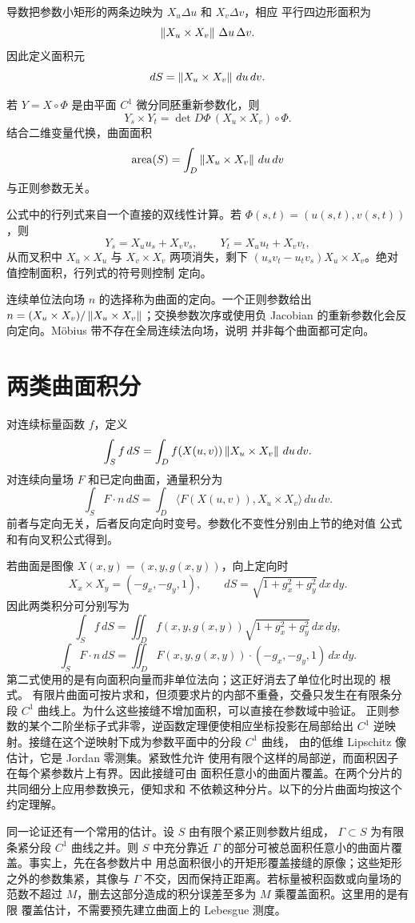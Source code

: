 导数把参数小矩形的两条边映为 $X_u\Delta u$ 和 $X_v\Delta v$，相应
平行四边形面积为
\[
 \left\lVert X_u\times X_v\right\rVert\,\Delta u\,\Delta v.
\]
因此定义面积元
\[
 dS=\left\lVert X_u\times X_v\right\rVert\,du\,dv.
\]

若 $Y=X\circ\Phi$ 是由平面 $C^1$ 微分同胚重新参数化，则
\[
 Y_s\times Y_t
 =\det D\Phi\,(X_u\times X_v)\circ\Phi.
\]
结合二维变量代换，曲面面积
\[
 \operatorname{area}(S)=\int_D\left\lVert X_u\times X_v\right\rVert\,du\,dv
\]
与正则参数无关。

公式中的行列式来自一个直接的双线性计算。若
$\Phi(s,t)=(u(s,t),v(s,t))$，则
\[
 Y_s=X_u u_s+X_v v_s,\qquad
 Y_t=X_u u_t+X_v v_t,
\]
从而叉积中 $X_u\times X_u$ 与 $X_v\times X_v$ 两项消失，剩下
$(u_sv_t-u_tv_s)X_u\times X_v$。绝对值控制面积，行列式的符号则控制
定向。

连续单位法向场 $n$ 的选择称为曲面的定向。一个正则参数给出
$n=(X_u\times X_v)/\left\lVert X_u\times X_v\right\rVert$；交换参数次序或使用负
Jacobian 的重新参数化会反向定向。Möbius 带不存在全局连续法向场，说明
并非每个曲面都可定向。

\section{两类曲面积分}

对连续标量函数 $f$，定义
\[
 \int_Sf\,dS
 =\int_Df(X(u,v))\left\lVert X_u\times X_v\right\rVert\,du\,dv.
\]
对连续向量场 $F$ 和已定向曲面，通量积分为
\[
 \int_SF\cdot n\,dS
 =\int_D\langle F(X(u,v)),X_u\times X_v\rangle\,du\,dv.
\]
前者与定向无关，后者反向定向时变号。参数化不变性分别由上节的绝对值
公式和有向叉积公式得到。

若曲面是图像 $X(x,y)=(x,y,g(x,y))$，向上定向时
\[
 X_x\times X_y=(-g_x,-g_y,1),\qquad
 dS=\sqrt{1+g_x^2+g_y^2}\,dx\,dy.
\]
因此两类积分可分别写为
\[
 \int_S f\,dS
 =\iint_D f(x,y,g(x,y))\sqrt{1+g_x^2+g_y^2}\,dx\,dy,
\]
\[
 \int_SF\cdot n\,dS
 =\iint_DF(x,y,g(x,y))\cdot(-g_x,-g_y,1)\,dx\,dy.
\]
第二式使用的是有向面积向量而非单位法向；这正好消去了单位化时出现的
根式。
有限片曲面可按片求和，但须要求片的内部不重叠，交叠只发生在有限条分段
$C^1$ 曲线上。为什么这些接缝不增加面积，可以直接在参数域中验证。
正则参数的某个二阶坐标子式非零，逆函数定理便使相应坐标投影在局部给出
$C^1$ 逆映射。接缝在这个逆映射下成为参数平面中的分段 $C^1$ 曲线，
由的低维 Lipschitz 像估计，它是
Jordan 零测集。紧致性允许
使用有限个这样的局部逆，而面积因子在每个紧参数片上有界。因此接缝可由
面积任意小的曲面片覆盖。在两个分片的共同细分上应用参数换元，便知求和
不依赖这种分片。以下的分片曲面均按这个约定理解。

同一论证还有一个常用的估计。设 $S$ 由有限个紧正则参数片组成，
$\Gamma\subset S$ 为有限条紧分段 $C^1$ 曲线之并。则 $S$ 中充分靠近
$\Gamma$ 的部分可被总面积任意小的曲面片覆盖。事实上，先在各参数片中
用总面积很小的开矩形覆盖接缝的原像；这些矩形之外的参数集紧，其像与
$\Gamma$ 不交，因而保持正距离。若标量被积函数或向量场的范数不超过
$M$，删去这部分造成的积分误差至多为 $M$ 乘覆盖面积。这里用的是有限
覆盖估计，不需要预先建立曲面上的 Lebesgue 测度。

